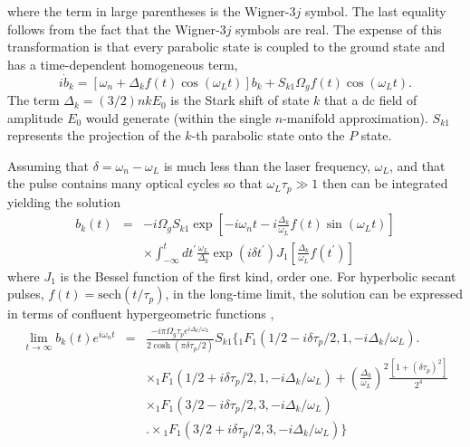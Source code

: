 where the term in large parentheses is the Wigner-$3j$ symbol.
The last equality follows from the fact that the Wigner-$3j$ symbols are
real.  The expense of this transformation is that every parabolic state is
coupled to the ground state and has a time-dependent homogeneous term,
\begin{equation}
i \dot{b}_k = \left[\omega_n + \Delta_k f(t)
\cos (\omega_L t)\right] b_k  
+S_{k1} \Omega_g f(t) \cos (\omega_L t) \label{eq:parabolic}.
\end{equation}
The term $\Delta_k = (3/2) n k E_0$ is the Stark shift of state $k$
that a dc field of amplitude $E_0$ would generate (within the
single $n$-manifold approximation).  $S_{k1}$ represents the
projection of the $k$-th parabolic state onto the $P$ state.
 
Assuming that $\delta = \omega_n - \omega_L$ is much less than the laser
frequency, $\omega_L$, and that the pulse contains many optical cycles
so that $\omega_L \tau_p \gg 1$ then  can be integrated
yielding the solution
\begin{eqnarray}
b_k(t)&=&-i \Omega_g S_{k1} \exp \left[-i\omega_n t -i
\frac{\Delta_k}{\omega_L} f(t)
\sin (\omega_L t)\right] \nonumber \\ 
&& \times \int_{-\infty}^{t} dt^{'} \frac{\omega_L}{\Delta_k}
\exp \left(i \delta t^{'}\right) J_{1} \left[\frac{\Delta_k}{\omega_L}
f\left(t^{'}\right)
\right] \label{eq:harmonics}
\end{eqnarray}
where $J_1$ is the Bessel function of the
first kind, order one.  For hyperbolic secant pulses, $f(t) =
\mathrm{sech}(t/\tau_p)$, in the long-time limit, the solution can be expressed
in terms of confluent hypergeometric functions \cite{Gradshteyn_Ryzhik},
\begin{eqnarray}
\lim_{t \rightarrow \infty} b_k(t) e^{i \omega_n t} & = &
\frac{-i \pi \Omega_g \tau_p e^{i \Delta_k/\omega_L}}
{2 \cosh(\pi \delta \tau_p/2)} S_{k1}
\Biggl\{
{}_1F_1\left(1/2-i\delta \tau_p/2,1,-i\Delta_k/\omega_L\right) 
\Biggr. \nonumber \\ 
&&\times {}_1F_1\left(1/2+i\delta \tau_p/2,1,-i\Delta_k/\omega_L\right) +
\left(\frac{\Delta_k}{\omega_L}\right)^2
\frac{\left[1+(\delta\tau_p)^2\right]}{2^4} \nonumber \\
&& \times {}_1F_1\left(3/2-i\delta \tau_p/2,3,-i\Delta_k/\omega_L\right)
\nonumber \\
&& \Biggl. \times {}_1F_1\left(3/2+i\delta
\tau_p/2,3,-i\Delta_k/\omega_L\right)
\Biggr\} \label{bigequation}
\end{eqnarray}
